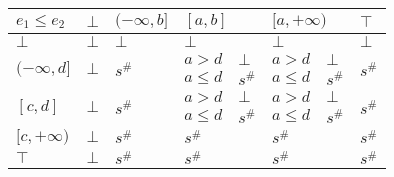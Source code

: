 \documentclass{article}
\begin{document}
\begin{table}[]
    \begin{tabular}{|l|l|l|ll|ll|l|}
    \hline
    $e_1 \le e_2$                   & $\bot$                  & $(-\infty, b]$          & \multicolumn{2}{l|}{$[a, b]$} & \multicolumn{2}{l|}{$[a, +\infty)$} & $\top$                  \\ \hline
    $\bot$                          & $\bot$                  & $\bot$                  & \multicolumn{2}{l|}{$\bot$}   & \multicolumn{2}{l|}{$\bot$}         & $\bot$                  \\ \hline
    \multirow{2}{*}{$(-\infty, d]$} & \multirow{2}{*}{$\bot$} & \multirow{2}{*}{$s^\#$} & $a > d$         & $\bot$      & $a > d$            & $\bot$         & \multirow{2}{*}{$s^\#$} \\
                                    &                         &                         & $a \le d$       & $s^\#$      & $a \le d$          & $s^\#$         &                         \\ \hline
    \multirow{2}{*}{$[c, d]$}       & \multirow{2}{*}{$\bot$} & \multirow{2}{*}{$s^\#$} & $a > d$         & $\bot$      & $a > d$            & $\bot$         & \multirow{2}{*}{$s^\#$} \\
                                    &                         &                         & $a \le d$       & $s^\#$      & $a \le d$          & $s^\#$         &                         \\ \hline
    $[c, +\infty)$                  & $\bot$                  & $s^\#$                  & \multicolumn{2}{l|}{$s^\#$}   & \multicolumn{2}{l|}{$s^\#$}         & $s^\#$                  \\ \hline
    $\top$                          & $\bot$                  & $s^\#$                  & \multicolumn{2}{l|}{$s^\#$}   & \multicolumn{2}{l|}{$s^\#$}         & $s^\#$                  \\ \hline
    \end{tabular}
    \end{table}
\end{document}

